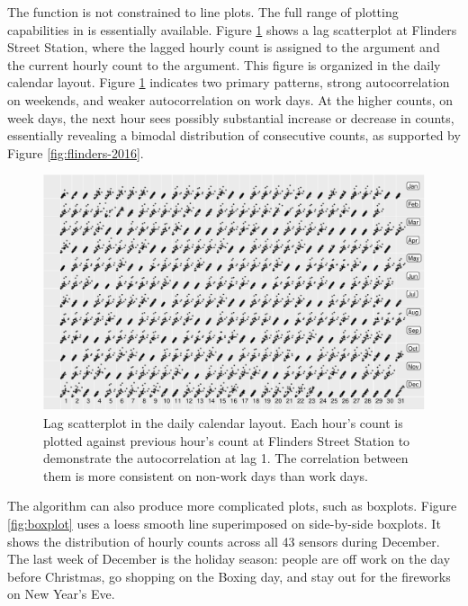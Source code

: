 The  function is not constrained to line plots.
The full range of plotting capabilities in  is essentially
available. Figure \ref{fig:scatterplot} shows a lag scatterplot at
Flinders Street Station, where the lagged hourly count is assigned to
the  argument and the current hourly count to the 
argument. This figure is organized in the daily calendar layout. Figure
\ref{fig:scatterplot} indicates two primary patterns, strong
autocorrelation on weekends, and weaker autocorrelation on work days. At
the higher counts, on week days, the next hour sees possibly substantial
increase or decrease in counts, essentially revealing a bimodal
distribution of consecutive counts, as supported by Figure
\ref{fig:flinders-2016}.

\begin{Schunk}
\begin{figure}

{\centering \includegraphics[width=\textwidth]{figure/scatterplot-1} 

}

\caption[Lag scatterplot in the daily calendar layout]{Lag scatterplot in the daily calendar layout. Each hour's count is plotted against previous hour's count at Flinders Street Station to demonstrate the autocorrelation at lag 1. The correlation between them is more consistent on non-work days than work days.}\label{fig:scatterplot}
\end{figure}
\end{Schunk}

The algorithm can also produce more complicated plots, such as boxplots.
Figure \ref{fig:boxplot} uses a loess smooth line superimposed on
side-by-side boxplots. It shows the distribution of hourly counts across
all 43 sensors during December. The last week of December is the holiday
season: people are off work on the day before Christmas, go shopping on
the Boxing day, and stay out for the fireworks on New Year's Eve.

